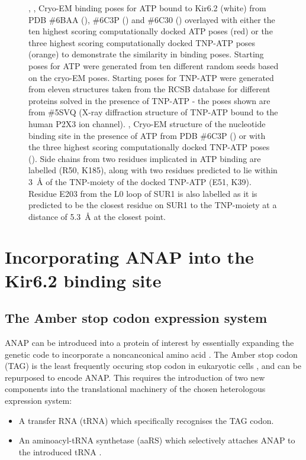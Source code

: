 \begin{figure}[hbtp]
	\caption[TNP-ATP is predicted to bind with a similar pose to ATP]{
	, ,  Cryo-EM binding poses for ATP bound to Kir6.2 (white) from PDB \#6BAA (), \#6C3P () and \#6C30 () overlayed with either the ten highest scoring computationally docked ATP poses (red) or the three highest scoring computationally docked TNP-ATP poses (orange) to demonstrate the similarity in binding poses.
	Starting poses for ATP were generated from ten different random seeds based on the cryo-EM poses.
	Starting poses for TNP-ATP were generated from eleven structures taken from the RCSB database for different proteins solved in the presence of TNP-ATP - the poses shown are from \#5SVQ (X-ray diffraction structure of TNP-ATP bound to the human P2X3 ion channel).
	,  Cryo-EM structure of the nucleotide binding site in the presence of ATP from PDB \#6C3P () or with the three highest scoring computationally docked TNP-ATP poses ().
	Side chains from two residues implicated in ATP binding are labelled (R50, K185), along with two residues predicted to lie within \SI{3}{\angstrom} of the TNP-moiety of the docked TNP-ATP (E51, K39).
	Residue E203 from the L0 loop of SUR1 is also labelled as it is predicted to be the closest residue on SUR1 to the TNP-moiety at a distance of \SI{5.3}{\angstrom} at the closest point.
	}\label{ch3fig:docking}
\end{figure}

\section{Incorporating ANAP into the Kir6.2 binding site}

\subsection{The Amber stop codon expression system}

ANAP can be introduced into a protein of interest by essentially expanding the genetic code to incorporate a noncanconical amino acid \cite{chin_expanding_2017}.
The Amber stop codon (TAG) is the least frequently occuring stop codon in eukaryotic cells \cite{cridge_eukaryotic_2018}, and can be repurposed to encode ANAP.
This requires the introduction of two new components into the translational machinery of the chosen heterologous expression system:
\begin{itemize}
\item A transfer RNA (tRNA) which specifically recognises the TAG codon.
\item An aminoacyl-tRNA synthetase (aaRS) which selectively attaches ANAP to the introduced tRNA \cite{lee_genetic_2009, chatterjee_genetically_2013}.
\end{itemize}

